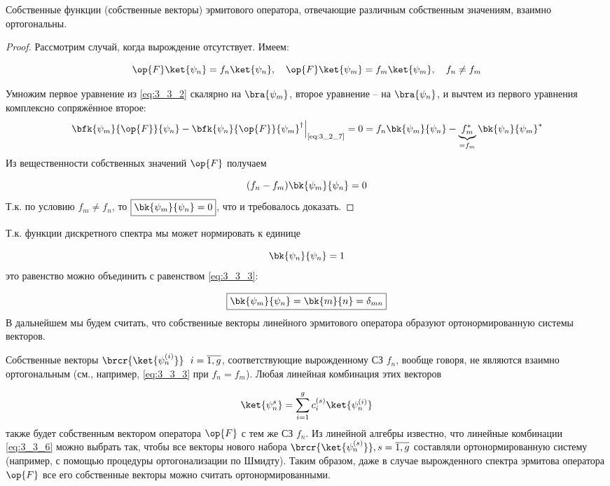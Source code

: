 \begin{stmt}
Собственные функции (собственные векторы) эрмитового оператора, отвечающие различным собственным значениям, взаимно ортогональны.
\end{stmt}
%
\begin{proof}

Рассмотрим случай, когда вырождение отсутствует. Имеем:

\begin{equation}
  \label{eq:3_3_2}
	\op{F}\ket{\psi_n} = f_n \ket{\psi_n},~~~
  \op{F}\ket{\psi_m} = f_m \ket{\psi_m},~~~
  f_n \neq f_m
\end{equation}

Умножим первое уравнение из \eqref{eq:3_3_2} скалярно на $\bra{\psi_m}$, второе уравнение -- на $\bra{\psi_n}$, и вычтем из первого уравнения комплексно сопряжённое второе:
$$
\left.
  \bfk{\psi_m}{\op{F}}{\psi_n} - \bfk{\psi_n}{\op{F}}{\psi_m}^\dag
      \right|_{\text{\eqref{eq:3_2_7}}} = 0 =
  f_n \bk{\psi_m}{\psi_n} - \underbrace{f_m^*}_{= f_m} \bk{\psi_n}{\psi_m}^*
$$%
%
Из вещественности собственных значений $\op{F}$ получаем

\begin{equation}
\label{eq:3_3_3}
(f_n - f_m) \bk{\psi_m}{\psi_n} = 0
\end{equation}%
%
Т.к. по условию $f_m \neq f_n$, то $\boxed{\bk{\psi_m}{\psi_n} = 0}$, что и требовалось доказать.
\end{proof}

Т.к. функции дискретного спектра мы может нормировать к единице

\begin{equation}
\label{eq:3_3_4}
\bk{\psi_n}{\psi_n} = 1
\end{equation}%
%
это равенство можно объединить с равенством \eqref{eq:3_3_3}:

\begin{equation}
\label{eq:3_3_5}
\boxed{
	\bk{\psi_m}{\psi_n} = \bk{m}{n} = \delta_{mn}
}
\end{equation}%
%
В дальнейшем мы будем считать, что собственные векторы линейного эрмитового оператора образуют ортонормированную системы векторов.

Собственные векторы $\brcr{\ket{\psi_n^{(i)}}} ~~ i = \overline{1,g}$, соответствующие вырожденному СЗ $f_n$, вообще говоря, не являются взаимно ортогональным (см., например, \eqref{eq:3_3_3} при $f_n = f_m$). Любая линейная комбинация этих векторов

\begin{equation}
\label{eq:3_3_6}
\ket{\psi_n^s} = \sum_{i=1}^{g} c_i^{(s)} \ket{\psi_n^{(i)}}
\end{equation}%
%
также будет собственным вектором оператора $\op{F}$ с тем же СЗ $f_n$. Из линейной алгебры известно, что линейные комбинации \eqref{eq:3_3_6} можно выбрать так, чтобы все векторы нового набора $\brcr{\ket{\psi_n^{(s)}}}, s = \overline{1,g}$ составляли ортонормированную систему (например, с помощью процедуры ортогонализации по Шмидту). Таким образом, даже в случае вырожденного спектра эрмитова оператора $\op{F}$ все его собственные векторы можно считать ортонормированными.


